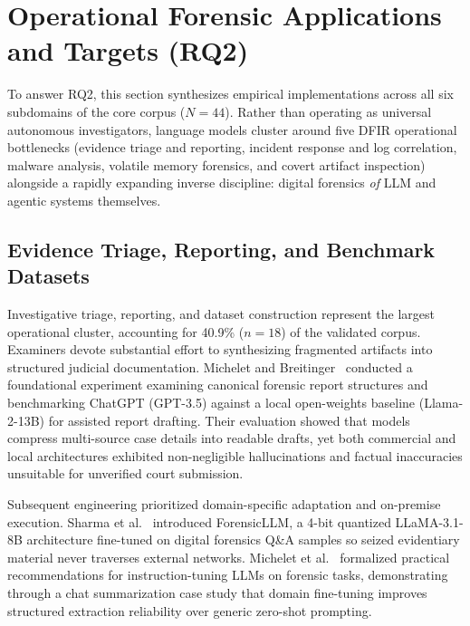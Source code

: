 \section{Operational Forensic Applications and Targets (RQ2)}
\label{sec:use_cases}

To answer RQ2, this section synthesizes empirical implementations across all six subdomains of the core corpus ($N=44$). Rather than operating as universal autonomous investigators, language models cluster around five DFIR operational bottlenecks (evidence triage and reporting, incident response and log correlation, malware analysis, volatile memory forensics, and covert artifact inspection) alongside a rapidly expanding inverse discipline: digital forensics \textit{of} LLM and agentic systems themselves.

\subsection{Evidence Triage, Reporting, and Benchmark Datasets}
Investigative triage, reporting, and dataset construction represent the largest operational cluster, accounting for 40.9\% ($n=18$) of the validated corpus. Examiners devote substantial effort to synthesizing fragmented artifacts into structured judicial documentation. Michelet and Breitinger~\cite{michelet2024_chatgpt} conducted a foundational experiment examining canonical forensic report structures and benchmarking ChatGPT (GPT-3.5) against a local open-weights baseline (Llama-2-13B) for assisted report drafting. Their evaluation showed that models compress multi-source case details into readable drafts, yet both commercial and local architectures exhibited non-negligible hallucinations and factual inaccuracies unsuitable for unverified court submission.

Subsequent engineering prioritized domain-specific adaptation and on-premise execution. Sharma et al.~\cite{sharma2025_forensicllm} introduced ForensicLLM, a 4-bit quantized LLaMA-3.1-8B architecture fine-tuned on digital forensics Q\&A samples so seized evidentiary material never traverses external networks. Michelet et al.~\cite{michelet2025_finetuning} formalized practical recommendations for instruction-tuning LLMs on forensic tasks, demonstrating through a chat summarization case study that domain fine-tuning improves structured extraction reliability over generic zero-shot prompting.

